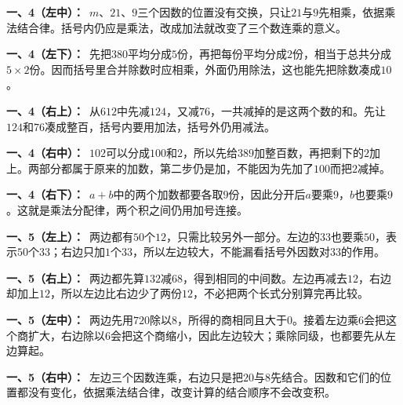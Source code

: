 \documentclass[multi=snippet,border=0pt]{standalone}
\newenvironment{snippet}[3]{\begin{minipage}{#1bp}\color{answerred}\fontsize{#2}{#3}\selectfont\raggedright}{\end{minipage}}
\begin{document}
\begin{snippet}{505}{11.5}{14}\textbf{一、4（左中）：}\ \(m\)、\(21\)、\(9\)三个因数的位置没有交换，只让\(21\)与\(9\)先相乘，依据乘法结合律。括号内仍应是乘法，改成加法就改变了三个数连乘的意义。\end{snippet}
\begin{snippet}{505}{11.5}{14}\textbf{一、4（左下）：}\ 先把\(380\)平均分成\(5\)份，再把每份平均分成\(2\)份，相当于总共分成\(5\times2\)份。因而括号里合并除数时应相乘，外面仍用除法，这也能先把除数凑成\(10\)。\end{snippet}
\begin{snippet}{505}{11.5}{14}\textbf{一、4（右上）：}\ 从\(612\)中先减\(124\)，又减\(76\)，一共减掉的是这两个数的和。先让\(124\)和\(76\)凑成整百，括号内要用加法，括号外仍用减法。\end{snippet}
\begin{snippet}{505}{11.5}{14}\textbf{一、4（右中）：}\ \(102\)可以分成\(100\)和\(2\)，所以先给\(389\)加整百数，再把剩下的\(2\)加上。两部分都属于原来的加数，第二步仍是加，不能因为先加了\(100\)而把\(2\)减掉。\end{snippet}
\begin{snippet}{505}{11.5}{14}\textbf{一、4（右下）：}\ \(a+b\)中的两个加数都要各取\(9\)份，因此分开后\(a\)要乘\(9\)，\(b\)也要乘\(9\)。这就是乘法分配律，两个积之间仍用加号连接。\end{snippet}
\begin{snippet}{505}{11.5}{14}\textbf{一、5（左上）：}\ 两边都有\(50\)个\(12\)，只需比较另外一部分。左边的\(33\)也要乘\(50\)，表示\(50\)个\(33\)；右边只加\(1\)个\(33\)，所以左边较大，不能漏看括号外因数对\(33\)的作用。\end{snippet}
\begin{snippet}{505}{11.5}{14}\textbf{一、5（右上）：}\ 两边都先算\(132\)减\(68\)，得到相同的中间数。左边再减去\(12\)，右边却加上\(12\)，所以左边比右边少了两份\(12\)，不必把两个长式分别算完再比较。\end{snippet}
\begin{snippet}{505}{11.5}{14}\textbf{一、5（左中）：}\ 两边先用\(720\)除以\(8\)，所得的商相同且大于\(0\)。接着左边乘\(6\)会把这个商扩大，右边除以\(6\)会把这个商缩小，因此左边较大；乘除同级，也都要先从左边算起。\end{snippet}
\begin{snippet}{505}{11.5}{14}\textbf{一、5（右中）：}\ 左边三个因数连乘，右边只是把\(20\)与\(8\)先结合。因数和它们的位置都没有变化，依据乘法结合律，改变计算的结合顺序不会改变积。\end{snippet}
\end{document}
